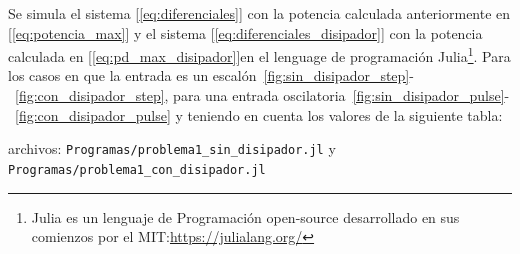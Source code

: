 \documentclass[10pt]{article}
\begin{document}
Se simula el sistema [\ref{eq:diferenciales}] con la potencia calculada anteriormente en [\ref{eq:potencia_max}]  y el sistema [\ref{eq:diferenciales_disipador}] con la potencia calculada en [\ref{eq:pd_max_disipador}]en el lenguage de programación
Julia\footnote{Julia es un lenguaje de Programación open-source desarrollado en sus comienzos por el MIT:\url{https://julialang.org/}}. Para los casos en que la
entrada es un escalón~\ref{fig:sin_disipador_step}-~\ref{fig:con_disipador_step}, para una entrada oscilatoria~\ref{fig:sin_disipador_pulse}-~\ref{fig:con_disipador_pulse} y teniendo en cuenta los valores de la siguiente tabla:

archivos: \verb|Programas/problema1_sin_disipador.jl| y \verb|Programas/problema1_con_disipador.jl|
\end{document}
